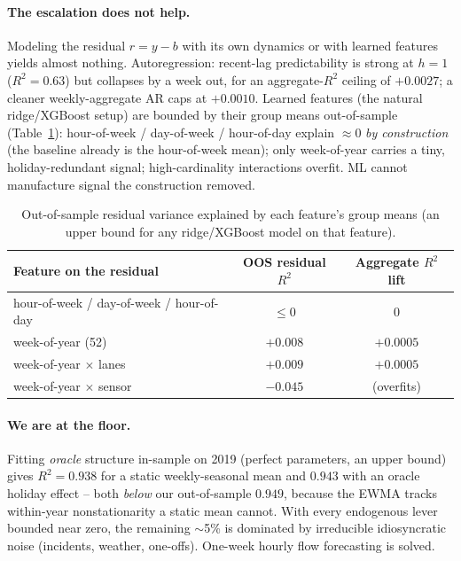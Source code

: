 \documentclass[11pt]{article}
\begin{document}
\paragraph{The escalation does not help.} Modeling the residual
$r=y-b$ with its own dynamics or with learned features yields almost nothing.
Autoregression: recent-lag predictability is strong at $h{=}1$ ($R^2{=}0.63$) but
collapses by a week out, for an aggregate-$R^2$ ceiling of $+0.0027$; a cleaner
weekly-aggregate AR caps at $+0.0010$. Learned features (the natural ridge/XGBoost
setup) are bounded by their group means out-of-sample (Table~\ref{tab:feat}):
hour-of-week / day-of-week / hour-of-day explain $\approx0$ \emph{by construction}
(the baseline already is the hour-of-week mean); only week-of-year carries a tiny,
holiday-redundant signal; high-cardinality interactions overfit. ML cannot
manufacture signal the construction removed.

\begin{table}[H]\centering
\caption{Out-of-sample residual variance explained by each feature's group means
(an upper bound for any ridge/XGBoost model on that feature).}
\label{tab:feat}
\begin{tabular}{lcc}
\toprule
Feature on the residual & OOS residual $R^2$ & Aggregate $R^2$ lift \\
\midrule
hour-of-week / day-of-week / hour-of-day & $\le 0$ & $0$ \\
week-of-year (52)            & $+0.008$ & $+0.0005$ \\
week-of-year $\times$ lanes  & $+0.009$ & $+0.0005$ \\
week-of-year $\times$ sensor & $-0.045$ & (overfits) \\
\bottomrule
\end{tabular}
\end{table}

\paragraph{We are at the floor.} Fitting \emph{oracle} structure in-sample on 2019
(perfect parameters, an upper bound) gives $R^2=0.938$ for a static weekly-seasonal
mean and $0.943$ with an oracle holiday effect -- both \emph{below} our
out-of-sample $0.949$, because the EWMA tracks within-year nonstationarity a static
mean cannot. With every endogenous lever bounded near zero, the remaining
$\sim$5\% is dominated by irreducible idiosyncratic noise (incidents, weather,
one-offs). One-week hourly flow forecasting is solved.
\end{document}
